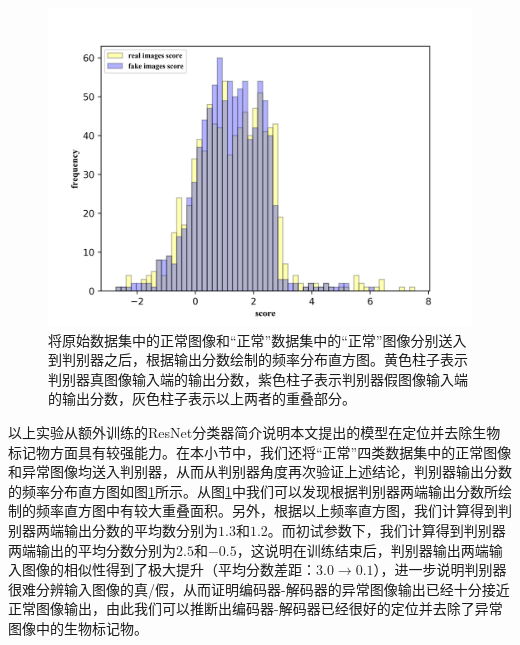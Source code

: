 \begin{figure}[h]
	\centering
	\includegraphics[width=1.0\textwidth]{figure/simulated_skin_score_distribution.png}
	\caption{将原始数据集中的正常图像和“正常”数据集中的“正常”图像分别送入到判别器之后，根据输出分数绘制的频率分布直方图。黄色柱子表示判别器真图像输入端的输出分数，紫色柱子表示判别器假图像输入端的输出分数，灰色柱子表示以上两者的重叠部分。}
	\label{fig:simulated_skin_hist_freq}
\end{figure}

以上实验从额外训练的ResNet分类器简介说明本文提出的模型在定位并去除生物标记物方面具有较强能力。在本小节中，我们还将“正常”四类数据集中的正常图像和异常图像均送入判别器，从而从判别器角度再次验证上述结论，判别器输出分数的频率分布直方图如图\ref{fig:simulated_skin_hist_freq}所示。从图\ref{fig:simulated_skin_hist_freq}中我们可以发现根据判别器两端输出分数所绘制的频率直方图中有较大重叠面积。另外，根据以上频率直方图，我们计算得到判别器两端输出分数的平均数分别为$1.3 $和$1.2$。而初试参数下，我们计算得到判别器两端输出的平均分数分别为$2.5$和$-0.5$，这说明在训练结束后，判别器输出两端输入图像的相似性得到了极大提升（平均分数差距：$3.0\rightarrow 0.1$），进一步说明判别器很难分辨输入图像的真/假，从而证明编码器-解码器的异常图像输出已经十分接近正常图像输出，由此我们可以推断出编码器-解码器已经很好的定位并去除了异常图像中的生物标记物。

